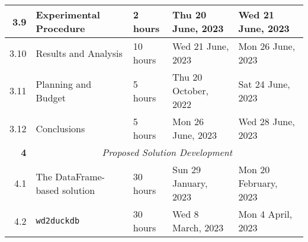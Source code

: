 \documentclass{standalone}
\begin{document}
\begin{tabular}{|r|llll|}
    3.9                                                           & \multicolumn{1}{l|}{Experimental Procedure}                     & \multicolumn{1}{l|}{2 hours}                                   & \multicolumn{1}{l|}{Thu 20 June, 2023}                      & Wed 21 June, 2023                                            \\ \hline
    3.10                                                          & \multicolumn{1}{l|}{Results and Analysis}                       & \multicolumn{1}{l|}{10 hours}                                  & \multicolumn{1}{l|}{Wed 21 June, 2023}                      & Mon 26 June, 2023                                            \\ \hline
    3.11                                                          & \multicolumn{1}{l|}{Planning and Budget}                        & \multicolumn{1}{l|}{5 hours}                                   & \multicolumn{1}{l|}{Thu 20 October, 2022}                   & Sat 24 June, 2023                                            \\ \hline
    3.12                                                          & \multicolumn{1}{l|}{Conclusions}                                & \multicolumn{1}{l|}{5 hours}                                   & \multicolumn{1}{l|}{Mon 26 June, 2023}                      & Wed 28 June, 2023                                            \\ \hline
    \textbf{4}                                                    & \multicolumn{4}{c|}{\textit{Proposed Solution Development}}                                                                                                                                                                                                   \\ \hline
    4.1                                                           & \multicolumn{1}{l|}{The DataFrame-based solution}               & \multicolumn{1}{l|}{30 hours}                                  & \multicolumn{1}{l|}{Sun 29 January, 2023}                   & Mon 20 February, 2023                                        \\ \hline
    4.2                                                           & \multicolumn{1}{l|}{\texttt{wd2duckdb}}                         & \multicolumn{1}{l|}{30 hours}                                  & \multicolumn{1}{l|}{Wed 8 March, 2023}                      & Mon 4 April, 2023                                            \\ \hline

\end{tabular}
\end{document}
